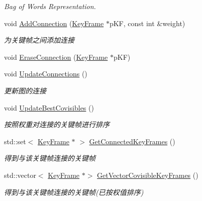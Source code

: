 \begin{DoxyCompactItemize}
\begin{DoxyCompactList}\small\item\em Bag of Words Representation. \end{DoxyCompactList}\item 
void \mbox{\hyperlink{class_o_r_b___s_l_a_m2_1_1_key_frame_a8d21a23485b7c104a73d6ad3cccf4e93}{Add\+Connection}} (\mbox{\hyperlink{class_o_r_b___s_l_a_m2_1_1_key_frame}{Key\+Frame}} $\ast$p\+KF, const int \&weight)
\begin{DoxyCompactList}\small\item\em 为关键帧之间添加连接 \end{DoxyCompactList}\item 
void \mbox{\hyperlink{class_o_r_b___s_l_a_m2_1_1_key_frame_a0a2e676f5e594cf9330e197a2c7df378}{Erase\+Connection}} (\mbox{\hyperlink{class_o_r_b___s_l_a_m2_1_1_key_frame}{Key\+Frame}} $\ast$p\+KF)
\item 
void \mbox{\hyperlink{class_o_r_b___s_l_a_m2_1_1_key_frame_afe7026956c91d4e0a01812be9dc7e8d5}{Update\+Connections}} ()
\begin{DoxyCompactList}\small\item\em 更新图的连接 \end{DoxyCompactList}\item 
void \mbox{\hyperlink{class_o_r_b___s_l_a_m2_1_1_key_frame_a09cb8502509c136536bf8d45793f8872}{Update\+Best\+Covisibles}} ()
\begin{DoxyCompactList}\small\item\em 按照权重对连接的关键帧进行排序 \end{DoxyCompactList}\item 
std\+::set$<$ \mbox{\hyperlink{class_o_r_b___s_l_a_m2_1_1_key_frame}{Key\+Frame}} $\ast$ $>$ \mbox{\hyperlink{class_o_r_b___s_l_a_m2_1_1_key_frame_af4ffdf4441477a36c42d6605c573f1cf}{Get\+Connected\+Key\+Frames}} ()
\begin{DoxyCompactList}\small\item\em 得到与该关键帧连接的关键帧 \end{DoxyCompactList}\item 
std\+::vector$<$ \mbox{\hyperlink{class_o_r_b___s_l_a_m2_1_1_key_frame}{Key\+Frame}} $\ast$$>$ \mbox{\hyperlink{class_o_r_b___s_l_a_m2_1_1_key_frame_a9315d396634f6637f70f716336777b8d}{Get\+Vector\+Covisible\+Key\+Frames}} ()
\begin{DoxyCompactList}\small\item\em 得到与该关键帧连接的关键帧(已按权值排序) \end{DoxyCompactList}\item 
$$
\end{DoxyCompactItemize}
